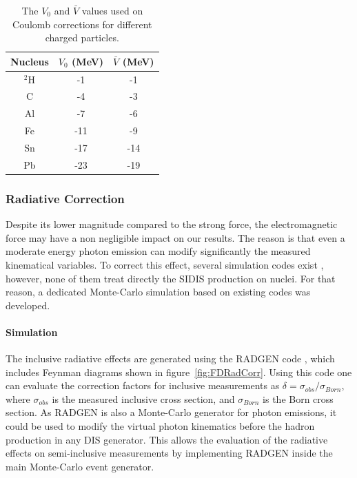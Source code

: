 \begin{table}[htbp]
  \centering
  \begin{tabular}{@{} ccc @{}}
    \hline
Nucleus & $V_0$ (MeV)  &  $\bar V$ (MeV) \\ \hline
$^2$H  & -1  &     -1 \\
C   &  -4 &      -3 \\
Al  &  -7 &      -6 \\
Fe  & -11 &    -9 \\
Sn  & -17 &   -14 \\
Pb  & -23 &   -19 \\
    \hline
  \end{tabular}
  \caption{The $V_0$ and $\bar V$ values used on Coulomb corrections for different charged particles.}
  \label{tab:Coulomb}
\end{table}

\subsubsection{Radiative Correction}
\label{RadCor}

Despite its lower magnitude compared to the strong force, the 
electromagnetic force may have a non negligible impact on our results. The 
reason is that even a moderate energy photon emission can modify significantly the measured kinematical variables. To correct this effect, several simulation codes exist \cite{Akushevich:2001yp}, however, none of them treat directly the SIDIS production on nuclei. For that reason, a dedicated Monte-Carlo simulation based on existing codes was developed.

\paragraph{Simulation}

The inclusive radiative effects are generated using the RADGEN code 
\cite{Akushevich:1998ft}, which includes Feynman diagrams shown in 
figure~\ref{fig:FDRadCorr}. Using this code one can evaluate the correction 
factors for inclusive measurements as $\delta = \sigma_{obs} / \sigma_{Born}$, where $\sigma_{obs}$ is the measured inclusive cross section, and $\sigma_{Born}$ is the Born cross section. As RADGEN is also a Monte-Carlo generator for photon emissions, it could be used to modify the virtual photon kinematics before the 
hadron production in any DIS generator. This allows the evaluation of the radiative 
effects on semi-inclusive measurements by implementing RADGEN inside the main 
Monte-Carlo event generator.


